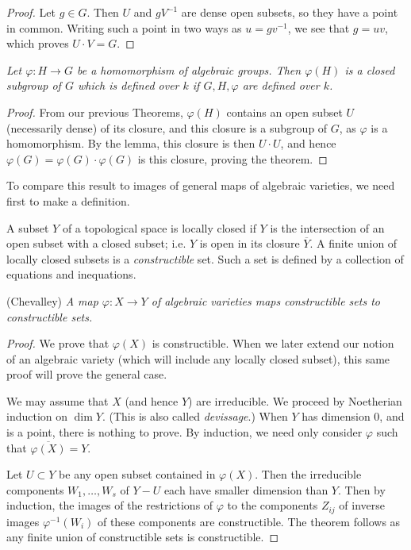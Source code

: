\documentclass[12pt]{amsart}
\begin{document}
\begin{proof}
Let $g\in G$.
Then $U$ and $gV^{-1}$ are dense open subsets, so they have a point in
common.
Writing such a point in two ways as $u=gv^{-1}$, we see that $g=uv$,
which proves $U\cdot V=G$.
\end{proof}

{\it
Let $\varphi\colon H\to G$ be a homomorphism of algebraic groups.
Then $\varphi(H)$ is a closed subgroup of $G$ which is defined over $k$ if
$G,H,\varphi$ are defined over $k$.
}\medskip

\begin{proof}
From our previous Theorems, $\varphi(H)$ contains an open subset $U$
(necessarily dense) of its closure, and this closure is a subgroup of $G$,
as $\varphi$ is a homomorphism.
By the lemma, this closure is then $U\cdot U$, and hence
$\varphi(G)=\varphi(G)\cdot\varphi(G)$ is this closure, proving the theorem.
\end{proof}


To compare this result to images of general maps of algebraic varieties, we
need first to make a definition.

A subset $Y$ of a topological space is locally closed if $Y$ is the
intersection of an open subset with a closed subset; i.e. $Y$ is open in its
closure $\overline{Y}$.
A finite union of locally closed subsets is a {\sl constructible} set.
Such a set is defined by a collection of equations and inequations.
\medskip

(Chevalley)
{\it
A map $\varphi\colon X\to Y$ of algebraic varieties
maps constructible sets to constructible sets.
}\medskip


\begin{proof}
We prove that $\varphi(X)$ is constructible.
When we later extend our notion of an algebraic variety
(which will include any locally closed subset), this same proof will 
prove the general case.

We may assume that $X$ (and hence $Y$) are irreducible.
We proceed by Noetherian induction on $\dim Y$.
(This is also called {\it devissage}.)
When $Y$ has dimension 0, and is a point, there is nothing to prove.
By induction, we need only consider $\varphi$ such that
$\overline{\varphi(X)}=Y$.


Let $U\subset Y$ be any open subset contained in $\varphi(X)$.
Then the irreducible components $W_1,\ldots, W_s$ of $Y-U$ each have smaller
dimension than $Y$.
Then by induction, the images of the restrictions of $\varphi$  to the
components $Z_{ij}$ of inverse images $\varphi^{-1}(W_i)$ of these
components are constructible.
The theorem follows as any finite union of constructible sets is
constructible. 
\end{proof}
\end{document}
